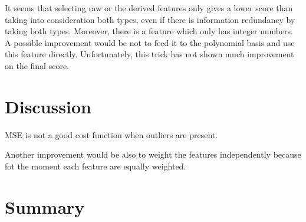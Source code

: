\documentclass[10pt,conference,compsocconf]{IEEEtran}
\begin{document}
It seems that selecting raw or the derived features only gives a lower score than taking into consideration both types, even if there is information redundancy by taking both types. 
Moreover, there is a feature which only has integer numbers. A possible improvement would be not to feed it to the polynomial basis and use this feature directly. Unfortunately, this trick has not shown much improvement on the final score.


\section{Discussion}
MSE is not a good cost function when outliers are present.

Another improvement would be also to weight the features independently because fot the moment each feature are equally weighted. 
\section{Summary}

%






\end{document}
